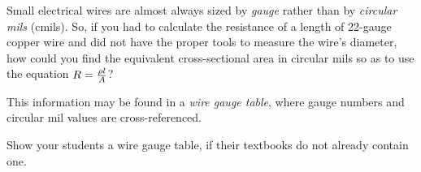

Small electrical wires are almost always sized by {\it gauge} rather than by {\it circular mils} (cmils).  So, if you had to calculate the resistance of a length of 22-gauge copper wire and did not have the proper tools to measure the wire's diameter, how could you find the equivalent cross-sectional area in circular mils so as to use the equation $R = {\rho l \over A}$?







This information may be found in a {\it wire gauge table}, where gauge numbers and circular mil values are cross-referenced.







Show your students a wire gauge table, if their textbooks do not already contain one.




